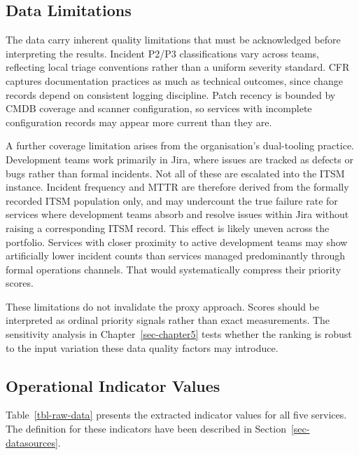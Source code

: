 \documentclass[
  12pt,
  letterpaper,
  12pt,
  oneside,
  english,
  onehalfspacing,
  headsepline]{MastersDoctoralThesis}
\begin{document}
\subsection{Data Limitations}\label{sec-datalimitations}

The data carry inherent quality limitations that must be acknowledged
before interpreting the results. Incident P2/P3 classifications vary
across teams, reflecting local triage conventions rather than a uniform
severity standard. CFR captures documentation practices as much as
technical outcomes, since change records depend on consistent logging
discipline. Patch recency is bounded by CMDB coverage and scanner
configuration, so services with incomplete configuration records may
appear more current than they are.

A further coverage limitation arises from the organisation's
dual-tooling practice. Development teams work primarily in Jira, where
issues are tracked as defects or bugs rather than formal incidents. Not
all of these are escalated into the ITSM instance. Incident frequency
and MTTR are therefore derived from the formally recorded ITSM
population only, and may undercount the true failure rate for services
where development teams absorb and resolve issues within Jira without
raising a corresponding ITSM record. This effect is likely uneven across
the portfolio. Services with closer proximity to active development
teams may show artificially lower incident counts than services managed
predominantly through formal operations channels. That would
systematically compress their priority scores.

These limitations do not invalidate the proxy approach. Scores should be
interpreted as ordinal priority signals rather than exact measurements.
The sensitivity analysis in Chapter~\ref{sec-chapter5} tests whether the
ranking is robust to the input variation these data quality factors may
introduce.

\subsection{Operational Indicator
Values}\label{operational-indicator-values}

Table~\ref{tbl-raw-data} presents the extracted indicator values for all
five services. The definition for these indicators have been described
in Section~\ref{sec-datasources}.
\end{document}
